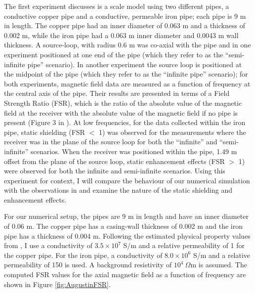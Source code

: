 The first experiment \cite{Augustin1989} discusses is a scale model using two different pipes, a conductive copper pipe and a conductive, permeable iron pipe; each pipe is 9 m in length. The copper pipe had an inner diameter of 0.063 m and a thickness of 0.002 m, while the iron pipe had a 0.063 m inner diameter and 0.0043 m wall thickness. A source-loop, with radius 0.6 m was co-axial with the pipe and in one experiment positioned at one end of the pipe (which they refer to as the ``semi-infinite pipe'' scenario). In another experiment the source loop is positioned at the midpoint of the pipe (which they refer to as the ``infinite pipe'' scenario); for both experiments, magnetic field data are measured as a function of frequency at the central axis of the pipe. Their results are presented in terms of a Field Strength Ratio (FSR), which is the ratio of the absolute value of the magnetic field at the receiver with the absolute value of the magnetic field if no pipe is present (Figure 3 in \cite{Augustin1989}). At low frequencies, for the data collected within the iron pipe, static shielding (FSR $<$ 1) was observed for the measurements where the receiver was in the plane of the source loop for both the ``infinite'' and ``semi-infinite'' scenarios. When the receiver was positioned within the pipe, 1.49 m offset from the plane of the source loop, static enhancement effects (FSR $>$ 1) were observed for both the infinite and semi-infinite scenarios. Using this experiment for context, I will compare the behaviour of our numerical simulation with the observations in \citep{Augustin1989} and examine the nature of the static shielding and enhancement effects.

For our numerical setup, the pipes are 9 m in length and have an inner diameter of 0.06 m. The copper pipe has a casing-wall thickness of 0.002 m and the iron pipe has a thickness of 0.004 m. Following the estimated physical property values from \cite{Augustin1989}, I use a conductivity of $3.5 \times 10^7$ S/m and a relative permeability of 1 for the copper pipe. For the iron pipe, a conductivity of $8.0 \times 10^6$ S/m and a relative permeability of 150 is used. A background resistivity of $10^4 ~\Omega$m is assumed. The computed FSR values for the axial magnetic field as a function of frequency are shown in Figure \ref{fig:AugustinFSR}.




